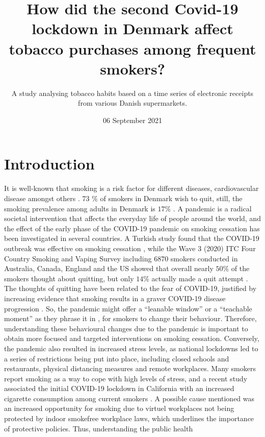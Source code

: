 \documentclass[
  11pt,
]{article}
\title{How did the second Covid-19 lockdown in Denmark affect tobacco
purchases among frequent smokers?}
\subtitle{A study analysing tobacco habits based on a time series of
electronic receipts from various Danish supermarkets.}
\author{}
\date{\vspace{-2.5em}\small 06 September 2021}
\begin{document}
\maketitle

\hypertarget{introduction}{%
\section{Introduction}\label{introduction}}

It is well-known that smoking is a risk factor for different diseases,
cardiovascular disease amongst others \cite{fda}. 73 \% of smokers in
Denmark wish to quit, still, the smoking prevalence among adults in
Denmark is \(17 \%\) \cite{sundhedsstyrelsen}. A pandemic is a radical
societal intervention that affects the everyday life of people around
the world, and the effect of the early phase of the COVID-19 pandemic on
smoking cessation has been investigated in several countries. A Turkish
study found that the COVID-19 outbreak was effective on smoking
cessation \cite{turkish}, while the Wave 3 (2020) ITC Four Country
Smoking and Vaping Survey including 6870 smokers conducted in Australia,
Canada, England and the US showed that overall nearly \(50 \%\) of the
smokers thought about quitting, but only \(14 \%\) actually made a quit
attempt \cite{wave3}. The thoughts of quitting have been related to the
fear of COVID-19, justified by increasing evidence that smoking results
in a graver COVID-19 disease progression \cite{unionbrief}. So, the
pandemic might offer a ``leanable window'' \cite{todolist} or a
``teachable moment'' as they phrase it in \cite{addiction}, for smokers
to change their behaviour. Therefore, understanding these behavioural
changes due to the pandemic is important to obtain more focused and
targeted interventions on smoking cessation. \newline Conversely, the
pandemic also resulted in increased stress levels, as national lockdowns
led to a series of restrictions being put into place, including closed
schools and restaurants, physical distancing measures and remote
workplaces. Many smokers report smoking as a way to cope with high
levels of stress, and a recent study associated the initial COVID-19
lockdown in California with an increased cigarette consumption among
current smokers \cite{california}. A possible cause mentioned was an
increased opportunity for smoking due to virtuel workplaces not being
protected by indoor smokefree workplace laws, which underlines the
importance of protective policies. Thus, understanding the public health
\end{document}
